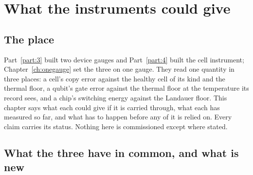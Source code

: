 \chapter{What the instruments could give}\label{ch:reach}

\section*{The place}
Part~\ref{part:3} built two device gauges and Part~\ref{part:4} built the cell instrument; Chapter~\ref{ch:onegauge} set the three on one gauge. They read
one quantity in three places: a cell's copy error against the healthy cell of its kind and the thermal floor, a qubit's gate error against the
thermal floor at the temperature its record sees, and a chip's switching energy against the Landauer floor. This chapter says what each could give if it is carried through, what
each has measured so far, and what has to happen before any of it is relied on. Every claim carries its status. Nothing here is commissioned
except where stated.

\section{What the three have in common, and what is new}

